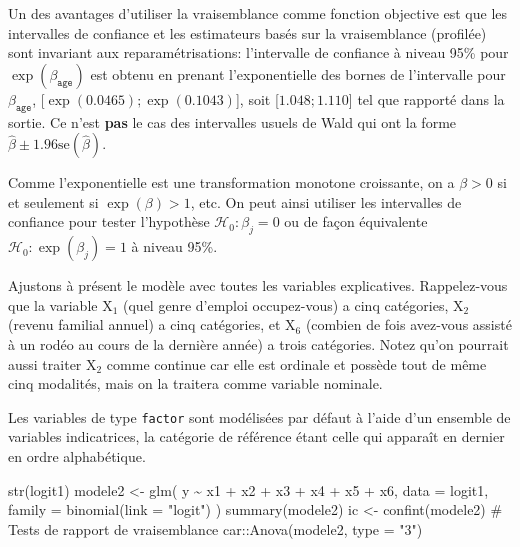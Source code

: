 \documentclass[
  11pt,
  letterpaper,
]{scrbook}
\newenvironment{Shaded}{\begin{snugshade}}{\end{snugshade}}
\newcommand{\AttributeTok}[1]{\textcolor[rgb]{0.40,0.45,0.13}{#1}}
\newcommand{\CommentTok}[1]{\textcolor[rgb]{0.37,0.37,0.37}{#1}}
\newcommand{\FunctionTok}[1]{\textcolor[rgb]{0.28,0.35,0.67}{#1}}
\newcommand{\NormalTok}[1]{\textcolor[rgb]{0.00,0.23,0.31}{#1}}
\newcommand{\OtherTok}[1]{\textcolor[rgb]{0.00,0.23,0.31}{#1}}
\newcommand{\SpecialCharTok}[1]{\textcolor[rgb]{0.37,0.37,0.37}{#1}}
\newcommand{\StringTok}[1]{\textcolor[rgb]{0.13,0.47,0.30}{#1}}
\theoremstyle{definition}
\theoremstyle{remark}
\begin{document}
Un des avantages d'utiliser la vraisemblance comme fonction objective
est que les intervalles de confiance et les estimateurs basés sur la
vraisemblance (profilée) sont invariant aux reparamétrisations:
l'intervalle de confiance à niveau 95\% pour
\(\exp(\beta_{\texttt{age}})\) est obtenu en prenant l'exponentielle des
bornes de l'intervalle pour \(\beta_{\texttt{age}}\),
{[}\(\exp(0.0465); \exp(0.1043)\){]}, soit {[}\(1.048; 1.110\){]} tel
que rapporté dans la sortie. Ce n'est \textbf{pas} le cas des
intervalles usuels de Wald qui ont la forme
\(\widehat{\beta} \pm 1.96 \mathrm{se}(\widehat{\beta})\).

Comme l'exponentielle est une transformation monotone croissante, on a
\(\beta>0\) si et seulement si \(\exp(\beta)>1\), etc. On peut ainsi
utiliser les intervalles de confiance pour tester l'hypothèse
\(\mathscr{H}_0: \beta_j=0\) ou de façon équivalente
\(\mathscr{H}_0: \exp(\beta_j)=1\) à niveau 95\%.

Ajustons à présent le modèle avec toutes les variables explicatives.
Rappelez-vous que la variable \(\mathrm{X}_1\) (quel genre d'emploi
occupez-vous) a cinq catégories, \(\mathrm{X}_2\) (revenu familial
annuel) a cinq catégories, et \(\mathrm{X}_6\) (combien de fois
avez-vous assisté à un rodéo au cours de la dernière année) a trois
catégories. Notez qu'on pourrait aussi traiter \(\mathrm{X}_2\) comme
continue car elle est ordinale et possède tout de même cinq modalités,
mais on la traitera comme variable nominale.

Les variables de type \texttt{factor} sont modélisées par défaut à
l'aide d'un ensemble de variables indicatrices, la catégorie de
référence étant celle qui apparaît en dernier en ordre alphabétique.

\begin{Shaded}
\begin{Highlighting}[]
\FunctionTok{str}\NormalTok{(logit1)}
\NormalTok{modele2 }\OtherTok{\textless{}{-}} \FunctionTok{glm}\NormalTok{(}
\NormalTok{  y }\SpecialCharTok{\textasciitilde{}}\NormalTok{ x1 }\SpecialCharTok{+}\NormalTok{ x2 }\SpecialCharTok{+}\NormalTok{ x3 }\SpecialCharTok{+}\NormalTok{ x4 }\SpecialCharTok{+}\NormalTok{ x5 }\SpecialCharTok{+}\NormalTok{ x6,}
  \AttributeTok{data =}\NormalTok{ logit1,}
  \AttributeTok{family =} \FunctionTok{binomial}\NormalTok{(}\AttributeTok{link =} \StringTok{"logit"}\NormalTok{)}
\NormalTok{)}
\FunctionTok{summary}\NormalTok{(modele2)}
\NormalTok{ic }\OtherTok{\textless{}{-}} \FunctionTok{confint}\NormalTok{(modele2)}
\CommentTok{\# Tests de rapport de vraisemblance}
\NormalTok{car}\SpecialCharTok{::}\FunctionTok{Anova}\NormalTok{(modele2, }\AttributeTok{type =} \StringTok{"3"}\NormalTok{)}
\end{Highlighting}
\end{Shaded}
\end{document}
